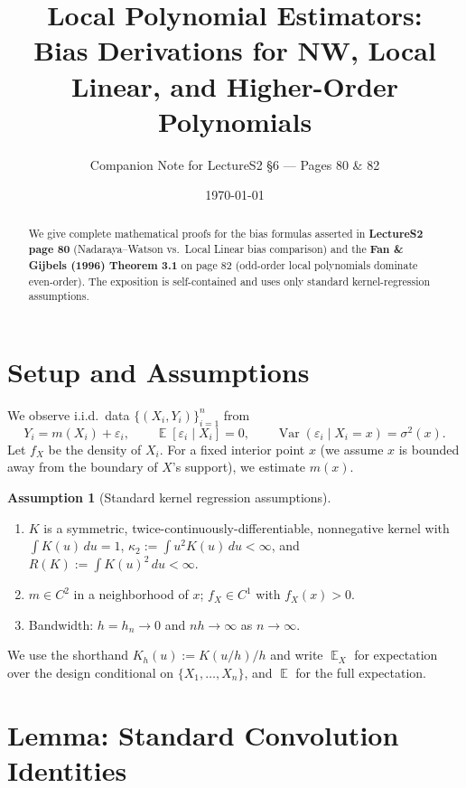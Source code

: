 \documentclass[11pt]{article}
\title{\bfseries Local Polynomial Estimators:\\
\large Bias Derivations for NW, Local Linear, and Higher-Order Polynomials}
\author{Companion Note for LectureS2 §6 — Pages 80 \& 82}
\date{\today}
\theoremstyle{plain}
\theoremstyle{definition}
\newtheorem{assumption}{Assumption}
\theoremstyle{remark}
\DeclareMathOperator{\E}{\mathbb{E}}
\DeclareMathOperator{\Var}{Var}
\begin{document}
\maketitle

\begin{abstract}
\noindent We give complete mathematical proofs for the bias formulas asserted in
\textbf{LectureS2 page 80} (Nadaraya--Watson vs.\ Local Linear bias comparison) and
the \textbf{Fan \& Gijbels (1996) Theorem 3.1} on page 82 (odd-order local
polynomials dominate even-order). The exposition is self-contained and uses
only standard kernel-regression assumptions.
\end{abstract}

\tableofcontents

\section{Setup and Assumptions}\label{sec:setup}

We observe i.i.d.\ data $\{(X_i, Y_i)\}_{i=1}^n$ from
\[
  Y_i = m(X_i) + \varepsilon_i, \qquad \E[\varepsilon_i\mid X_i] = 0,
  \qquad \Var(\varepsilon_i\mid X_i = x) = \sigma^2(x).
\]
Let $f_X$ be the density of $X_i$. For a fixed interior point $x$ (we assume
$x$ is bounded away from the boundary of $X$'s support), we estimate $m(x)$.

\begin{assumption}[Standard kernel regression assumptions]\label{ass:std}
\begin{enumerate}[leftmargin=2em,nosep]
\item $K$ is a symmetric, twice-continuously-differentiable, nonnegative kernel
with $\int K(u)\,du = 1$, $\kappa_2 := \int u^2 K(u)\,du < \infty$, and
$R(K) := \int K(u)^2\,du < \infty$.
\item $m \in C^2$ in a neighborhood of $x$; $f_X \in C^1$ with $f_X(x) > 0$.
\item Bandwidth: $h = h_n \to 0$ and $nh \to \infty$ as $n \to \infty$.
\end{enumerate}
\end{assumption}

We use the shorthand $K_h(u) := K(u/h)/h$ and write $\E_X$ for expectation
over the design conditional on $\{X_1,\ldots,X_n\}$, and $\E$ for the full
expectation.

\section{Lemma: Standard Convolution Identities}\label{sec:lemmas}
\end{document}
